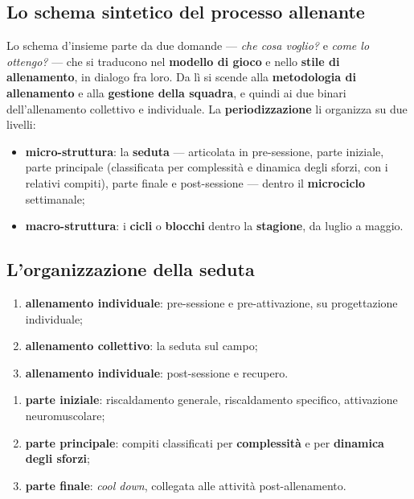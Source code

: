 \subsection{Lo schema sintetico del processo allenante}

Lo schema d'insieme parte da due domande --- \textit{che cosa voglio?} e \textit{come lo ottengo?}
--- che si traducono nel \textbf{modello di gioco} e nello \textbf{stile di allenamento}, in dialogo
fra loro. Da lì si scende alla \textbf{metodologia di allenamento} e alla \textbf{gestione della
squadra}, e quindi ai due binari dell'allenamento collettivo e individuale. La
\textbf{periodizzazione} li organizza su due livelli:

\begin{itemize}
  \item \textbf{micro-struttura}: la \textbf{seduta} --- articolata in pre-sessione, parte iniziale,
    parte principale (classificata per complessità e dinamica degli sforzi, con i relativi compiti),
    parte finale e post-sessione --- dentro il \textbf{microciclo} settimanale;
  \item \textbf{macro-struttura}: i \textbf{cicli} o \textbf{blocchi} dentro la
    \textbf{stagione}, da luglio a maggio.
\end{itemize}

\subsection{L'organizzazione della seduta}

\begin{enumerate}
  \item \textbf{allenamento individuale}: pre-sessione e pre-attivazione, su progettazione
    individuale;
  \item \textbf{allenamento collettivo}: la seduta sul campo;
  \item \textbf{allenamento individuale}: post-sessione e recupero.
\end{enumerate}

\begin{enumerate}
  \item \textbf{parte iniziale}: riscaldamento generale, riscaldamento specifico, attivazione
    neuromuscolare;
  \item \textbf{parte principale}: compiti classificati per \textbf{complessità} e per
    \textbf{dinamica degli sforzi};
  \item \textbf{parte finale}: \textit{cool down}, collegata alle attività post-allenamento.
\end{enumerate}


